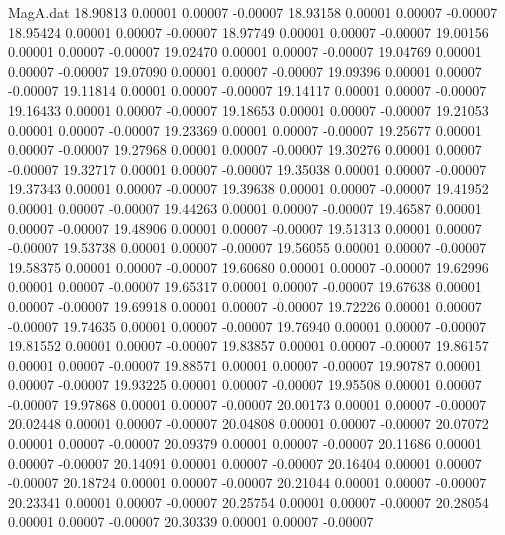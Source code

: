 \begin{filecontents}{MagA.dat}
  18.90813    0.00001    0.00007   -0.00007
  18.93158    0.00001    0.00007   -0.00007
  18.95424    0.00001    0.00007   -0.00007
  18.97749    0.00001    0.00007   -0.00007
  19.00156    0.00001    0.00007   -0.00007
  19.02470    0.00001    0.00007   -0.00007
  19.04769    0.00001    0.00007   -0.00007
  19.07090    0.00001    0.00007   -0.00007
  19.09396    0.00001    0.00007   -0.00007
  19.11814    0.00001    0.00007   -0.00007
  19.14117    0.00001    0.00007   -0.00007
  19.16433    0.00001    0.00007   -0.00007
  19.18653    0.00001    0.00007   -0.00007
  19.21053    0.00001    0.00007   -0.00007
  19.23369    0.00001    0.00007   -0.00007
  19.25677    0.00001    0.00007   -0.00007
  19.27968    0.00001    0.00007   -0.00007
  19.30276    0.00001    0.00007   -0.00007
  19.32717    0.00001    0.00007   -0.00007
  19.35038    0.00001    0.00007   -0.00007
  19.37343    0.00001    0.00007   -0.00007
  19.39638    0.00001    0.00007   -0.00007
  19.41952    0.00001    0.00007   -0.00007
  19.44263    0.00001    0.00007   -0.00007
  19.46587    0.00001    0.00007   -0.00007
  19.48906    0.00001    0.00007   -0.00007
  19.51313    0.00001    0.00007   -0.00007
  19.53738    0.00001    0.00007   -0.00007
  19.56055    0.00001    0.00007   -0.00007
  19.58375    0.00001    0.00007   -0.00007
  19.60680    0.00001    0.00007   -0.00007
  19.62996    0.00001    0.00007   -0.00007
  19.65317    0.00001    0.00007   -0.00007
  19.67638    0.00001    0.00007   -0.00007
  19.69918    0.00001    0.00007   -0.00007
  19.72226    0.00001    0.00007   -0.00007
  19.74635    0.00001    0.00007   -0.00007
  19.76940    0.00001    0.00007   -0.00007
  19.81552    0.00001    0.00007   -0.00007
  19.83857    0.00001    0.00007   -0.00007
  19.86157    0.00001    0.00007   -0.00007
  19.88571    0.00001    0.00007   -0.00007
  19.90787    0.00001    0.00007   -0.00007
  19.93225    0.00001    0.00007   -0.00007
  19.95508    0.00001    0.00007   -0.00007
  19.97868    0.00001    0.00007   -0.00007
  20.00173    0.00001    0.00007   -0.00007
  20.02448    0.00001    0.00007   -0.00007
  20.04808    0.00001    0.00007   -0.00007
  20.07072    0.00001    0.00007   -0.00007
  20.09379    0.00001    0.00007   -0.00007
  20.11686    0.00001    0.00007   -0.00007
  20.14091    0.00001    0.00007   -0.00007
  20.16404    0.00001    0.00007   -0.00007
  20.18724    0.00001    0.00007   -0.00007
  20.21044    0.00001    0.00007   -0.00007
  20.23341    0.00001    0.00007   -0.00007
  20.25754    0.00001    0.00007   -0.00007
  20.28054    0.00001    0.00007   -0.00007
  20.30339    0.00001    0.00007   -0.00007

\end{filecontents}

